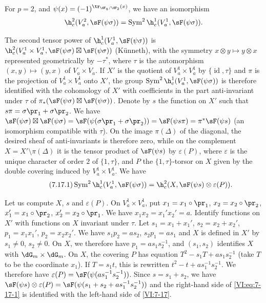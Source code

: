 \documentclass[oneside]{book}
\begin{document}
\begin{proposition_}\label{VI:7-17}
For $p=2$, and $\psi(x)=(-1)^{\tr_{\dF_q/\dF_2}(x)}$, we have an isomorphism 
\[
  \h_c^2(V_a^2,\sF(\psi\sigma)) = \operatorname{Sym}^2 \h_c^1(V_a^1,\sF(\psi\sigma)) \text{.} 
\]
\end{proposition_}

The second tensor power of $\h_c^1(V_a^1,\sF(\psi\sigma))$ is 
$\h_c^2(V_a^1\times V_a^1,\sF(\psi\sigma)\boxtimes \sF(\psi\sigma))$ 
(K\"unneth), with the symmetry $x\otimes y\mapsto y\otimes x$ represented 
geometrically by $-\tau^\ast$, where $\tau$ is the automorphism 
$(x,y)\mapsto (y,x)$ of $V_a\times V_a$. If $X'$ is the quotient of 
$V_a^1\times V_a^1$ by $\{\operatorname{id}{},\tau\}$ and $\pi$ is the 
projection of $V_a^1\times V_a^1$ onto $X'$, the group 
$\operatorname{Sym}^2 \h_c^1(V_a^1,\sF(\psi\sigma))$ is therefore identified with the 
cohomology of $X'$ with coefficients in the part anti-invariant under $\tau$ of 
$\pi_\ast(\sF(\psi\sigma)\boxtimes \sF(\psi\sigma))$. Denote by $s$ the function 
on $X'$ such that $s\pi =\sigma\pr_1+\sigma\pr_2$. We have 
$\sF(\psi\sigma)\boxtimes \sF(\psi\sigma) = \sF(\psi(\sigma\pr_1+\sigma\pr_2)) = \sF(\psi s \pi) = \pi^\ast \sF(\psi s)$ 
(an isomorphism compatible with $\tau$). On the image $\pi(\Delta)$ of the 
diagonal, the desired sheaf of anti-invariants is therefore zero, while on 
the complement $X=X'\setminus \pi(\Delta)$ it is the tensor product of 
$\sF(\psi s)$ by $\varepsilon(P)$, where $\varepsilon$ is the unique character 
of order $2$ of $\{1,\tau\}$, and $P$ the $\{1,\tau\}$-torsor on $X$ given by the 
double covering induced by $V_a^1\times V_a^1$. We have 
\begin{equation*}\tag{7.17.1}\label{VI:eq:7-17-1}
  \operatorname{Sym}^2 \h_c^1(V_a^1,\sF(\psi\sigma)) = \h_c^2(X,\sF(\psi s)\otimes \varepsilon(P)) \text{.}
\end{equation*}

Let us compute $X$, $s$ and $\varepsilon(P)$. On $V_a^1\times V_a^1$, put 
$x_1=x_1\circ\pr_1$, $x_2=x_2\circ\pr_2$, $x_1'=x_1\circ \pr_2$, 
$x_2'=x_2\circ \pr_1$. We have $x_1 x_2=x_1'x_2'=a$. Identify functions on 
$X'$ with functions on $X$ invariant under $\tau$. Let $s_1=x_1+x_1'$, 
$s_2=x_2+x_2'$, $p_1=x_1 x_1'$, $p_2=x_2 x_2'$. We have $s_1 p_2 = a s_2$, 
$s_2 p_1 = a s_1$ and $X$ is defined in $X'$ by $s_1\ne 0$, $s_2\ne 0$. On 
$X$, we therefore have $p_1 = a s_1 s_2^{-1}$, and $(s_1,s_2)$ identifies $X$ with 
$\dG_m\times \dG_m$. On $X$, the covering $P$ has equation 
$T^2-s_1 T+a s_1 s_2^{-1}$ (take $T$ to be the coordinate $x_1$). If 
$T=s_1 t$, this is rewritten $t^2-t+a s_1^{-1} s_2^{-1}$. We therefore have 
$\varepsilon(P) = \sF(\psi(a s_1^{-1} s_2^{-1}))$. Since $s=s_1+s_2$, we have 
$\sF(\psi s)\otimes \varepsilon(P) = \sF(\psi(s_1+s_2+ a s_1^{-1} s_2^{-1}))$ 
and the right-hand side of \eqref{VI:eq:7-17-1} is identified with the left-hand side of 
\ref{VI:7-17}. 
\end{document}
